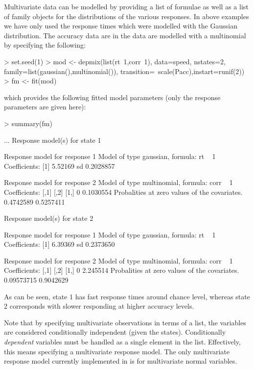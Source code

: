 \documentclass[article]{jss}
\begin{document}
Multivariate data can be modelled by providing a list of formulae as 
well as a list of family objects for the distributions of the various 
responses. In above examples we have only used the response times 
which were modelled with the Gaussian distribution. The accuracy data 
are in the  data are modelled with a multinomial by 
specifying the following: 
\begin{CodeChunk}
\begin{CodeInput}
> set.seed(1)
> mod <- depmix(list(rt~1,corr~1), data=speed, nstates=2, 
    family=list(gaussian(),multinomial()),
    transition=~scale(Pacc),instart=runif(2))
> fm <- fit(mod)
\end{CodeInput}
\end{CodeChunk}
which provides the following fitted model parameters (only the 
response parameters are given here): 
\begin{CodeChunk}
\begin{CodeInput}
> summary(fm)
\end{CodeInput}
\begin{CodeOutput}
...
Response model(s) for state 1 

Response model for response 1 
Model of type gaussian, formula: rt ~ 1
Coefficients: 
[1] 5.52169
sd  0.2028857 

Response model for response 2 
Model of type multinomial, formula: corr ~ 1
Coefficients: 
     [,1]      [,2]
[1,]    0 0.1030554
Probalities at zero values of the covariates.
0.4742589 0.5257411 

Response model(s) for state 2 

Response model for response 1 
Model of type gaussian, formula: rt ~ 1
Coefficients: 
[1] 6.39369
sd  0.2373650 

Response model for response 2 
Model of type multinomial, formula: corr ~ 1
Coefficients: 
	   [,1]     [,2]
[1,]    0 2.245514
Probalities at zero values of the covariates.
0.09573715 0.9042629 	
\end{CodeOutput}
\end{CodeChunk}
As can be seen, state 1 has fast response times around chance level, 
whereas state 2 corresponds with slower responding at higher accuracy 
levels. 

Note that by specifying multivariate observations in terms of a list, the 
variables are considered conditionally independent (given the states). 
Conditionally \emph{dependent} variables must be handled as a single element in
the list. Effectively, this means specifying a multivariate response model. The 
only multivariate response model currently implemented in  is for
multivariate normal variables.
\end{document}
